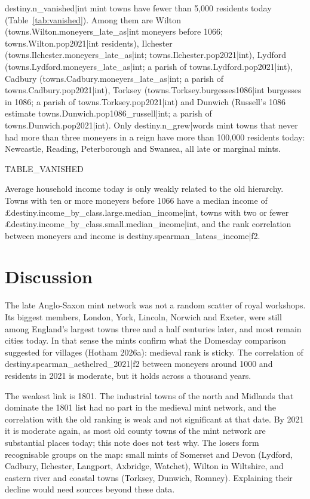 \documentclass[11pt,a4paper]{article}
\begin{document}
{{destiny.n_vanished|int}} mint towns have fewer than 5,000 residents today (Table~\ref{tab:vanished}). Among them are Wilton ({{towns.Wilton.moneyers_late_as|int}} moneyers before 1066; {{towns.Wilton.pop2021|int}} residents), Ilchester ({{towns.Ilchester.moneyers_late_as|int}}; {{towns.Ilchester.pop2021|int}}), Lydford ({{towns.Lydford.moneyers_late_as|int}}; a parish of {{towns.Lydford.pop2021|int}}), Cadbury ({{towns.Cadbury.moneyers_late_as|int}}; a parish of {{towns.Cadbury.pop2021|int}}), Torksey ({{towns.Torksey.burgesses1086|int}} burgesses in 1086; a parish of {{towns.Torksey.pop2021|int}}) and Dunwich (Russell's 1086 estimate {{towns.Dunwich.pop1086_russell|int}}; a parish of {{towns.Dunwich.pop2021|int}}). Only {{destiny.n_grew|words}} mint towns that never had more than three moneyers in a reign have more than 100,000 residents today: Newcastle, Reading, Peterborough and Swansea, all late or marginal mints.

{{TABLE_VANISHED}}

Average household income today is only weakly related to the old hierarchy. Towns with ten or more moneyers before 1066 have a median income of £{{destiny.income_by_class.large.median_income|int}}, towns with two or fewer £{{destiny.income_by_class.small.median_income|int}}, and the rank correlation between moneyers and income is {{destiny.spearman_lateas_income|f2}}.

\section{Discussion}

The late Anglo-Saxon mint network was not a random scatter of royal workshops. Its biggest members, London, York, Lincoln, Norwich and Exeter, were still among England's largest towns three and a half centuries later, and most remain cities today. In that sense the mints confirm what the Domesday comparison suggested for villages (Hotham 2026a): medieval rank is sticky. The correlation of {{destiny.spearman_aethelred_2021|f2}} between moneyers around 1000 and residents in 2021 is moderate, but it holds across a thousand years.

The weakest link is 1801. The industrial towns of the north and Midlands that dominate the 1801 list had no part in the medieval mint network, and the correlation with the old ranking is weak and not significant at that date. By 2021 it is moderate again, as most old county towns of the mint network are substantial places today; this note does not test why. The losers form recognisable groups on the map: small mints of Somerset and Devon (Lydford, Cadbury, Ilchester, Langport, Axbridge, Watchet), Wilton in Wiltshire, and eastern river and coastal towns (Torksey, Dunwich, Romney). Explaining their decline would need sources beyond these data.
\end{document}
